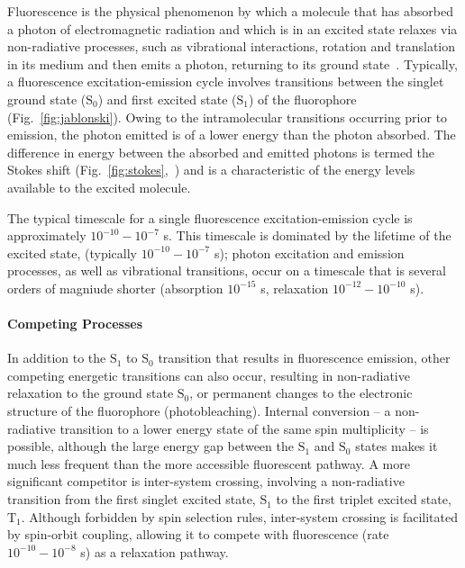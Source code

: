 Fluorescence is the physical phenomenon by which a molecule that has absorbed a photon of electromagnetic radiation and which is in an excited state relaxes via non-radiative processes, such as vibrational interactions, rotation and translation in its medium and then  emits a photon, returning to its ground state~\cite{valeur2001}. Typically, a fluorescence excitation-emission cycle involves transitions between the singlet ground state ($\text{S}_0$) and first excited state ($\text{S}_1$) of the fluorophore (Fig.~\ref{fig:jablonski}). Owing to the intramolecular transitions occurring prior to emission, the photon emitted is of a lower energy than the photon absorbed. The difference in energy between the absorbed and emitted photons is termed the Stokes shift (Fig.~\ref{fig:stokes},~\cite{Albani2011}) and is a characteristic of the energy levels available to the excited molecule. 

The typical timescale for a single fluorescence excitation-emission cycle is approximately $10^{-10} - 10^{-7}$ s. This timescale is dominated by the lifetime of the excited state, (typically $10^{-10} - 10^{-7}$ s); photon excitation and emission processes, as well as vibrational transitions, occur on a timescale that is several orders of magniude shorter (absorption $10^{-15}$ s, relaxation $10^{-12} - 10^{-10}$ s).

\paragraph{Competing Processes}
In addition to the $\text{S}_1$ to $\text{S}_0$ transition that results in fluorescence emission, other competing energetic transitions can also occur, resulting in non-radiative relaxation to the ground state $\text{S}_0$, or permanent changes to the electronic structure of the fluorophore (photobleaching). Internal conversion -- a non-radiative transition to a lower energy state of the same spin multiplicity -- is possible, although the large energy gap between the $\text{S}_1$ and $\text{S}_0$ states makes it much less frequent than the more accessible fluorescent pathway. A more significant competitor is inter-system crossing, involving a non-radiative transition from the first singlet excited state, $\text{S}_1$ to the first triplet excited state, $\text{T}_1$. Although forbidden by spin selection rules, inter-system crossing is facilitated by spin-orbit coupling, allowing it to compete with fluorescence (rate $10^{-10} - 10^{-8}$ s) as a relaxation pathway.

